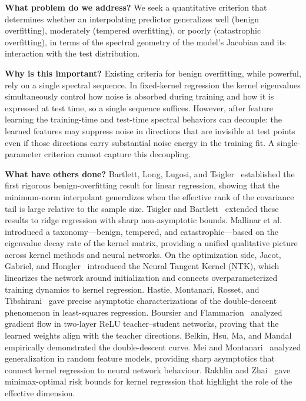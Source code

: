 \documentclass[12pt]{amsart}
\theoremstyle{definition}
\theoremstyle{remark}
\begin{document}
\medskip
\noindent\textbf{What problem do we address?}
We seek a quantitative criterion that determines whether an interpolating
predictor generalizes well (benign overfitting), moderately (tempered
overfitting), or poorly (catastrophic overfitting), in terms of the spectral
geometry of the model's Jacobian and its interaction with the test distribution.

\medskip
\noindent\textbf{Why is this important?}
Existing criteria for benign overfitting, while powerful, rely on a single
spectral sequence.  In fixed-kernel regression the kernel eigenvalues
simultaneously control how noise is absorbed during training and how it is
expressed at test time, so a single sequence suffices.  However, after feature
learning the training-time and test-time spectral behaviors can decouple: the
learned features may suppress noise in directions that are invisible at test
points even if those directions carry substantial noise energy in the training
fit.  A single-parameter criterion cannot capture this decoupling.

\medskip
\noindent\textbf{What have others done?}
Bartlett, Long, Lugosi, and Tsigler~\cite{BLLT2020} established the first
rigorous benign-overfitting result for linear regression, showing that the
minimum-norm interpolant generalizes when the effective rank of the covariance
tail is large relative to the sample size.  Tsigler and
Bartlett~\cite{TB2023} extended these results to ridge regression with sharp
non-asymptotic bounds.  Mallinar et al.~\cite{MSCBR2022} introduced a
taxonomy---benign, tempered, and catastrophic---based on the eigenvalue decay
rate of the kernel matrix, providing a unified qualitative picture across
kernel methods and neural networks.  On the optimization side, Jacot, Gabriel,
and Hongler~\cite{JGH2018} introduced the Neural Tangent Kernel (NTK), which
linearizes the network around initialization and connects overparameterized
training dynamics to kernel regression.  Hastie, Montanari, Rosset, and
Tibshirani~\cite{HMRT2022} gave precise asymptotic characterizations of the
double-descent phenomenon in least-squares regression.  Boursier and
Flammarion~\cite{BF2022} analyzed gradient flow in two-layer ReLU
teacher--student networks, proving that the learned weights align with the
teacher directions.  Belkin, Hsu, Ma, and Mandal~\cite{BHMM2019} empirically
demonstrated the double-descent curve.  Mei and Montanari~\cite{MM2022}
analyzed generalization in random feature models, providing sharp asymptotics
that connect kernel regression to neural network behaviour.  Rakhlin and
Zhai~\cite{RZ2019} gave minimax-optimal risk bounds for kernel regression
that highlight the role of the effective dimension.
\end{document}
